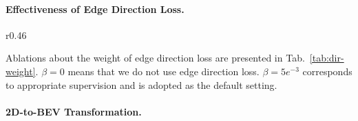 \documentclass{article} \usepackage{iclr2023_conference,times}
\begin{document}
\paragraph{Effectiveness of Edge Direction Loss.}

\begin{wraptable}{r}{0.46\linewidth}
\vspace{-1.0em}
\centering
{}
\vspace*{-0.25cm}
\caption{Ablations about the weight $\beta$ of edge direction loss.}
\label{tab:dir-weight}
\vspace{-3em}
\end{wraptable}
Ablations about the weight of edge direction loss are presented in Tab.~\ref{tab:dir-weight}. $\beta = 0$ means that we do not use edge direction loss. $\beta = 5e^{-3}$ corresponds to appropriate supervision and is adopted as the default setting.
\vspace{1em}


\paragraph{2D-to-BEV Transformation.}
\end{document}
